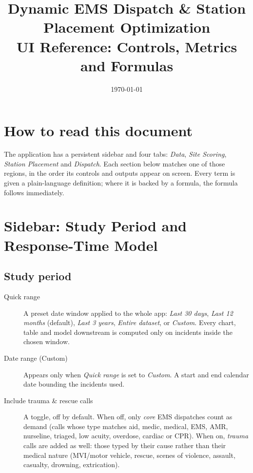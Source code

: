 \documentclass[11pt]{article}
\title{Dynamic EMS Dispatch \& Station Placement Optimization\\[4pt]
\large UI Reference: Controls, Metrics and Formulas}
\author{}
\date{\today}
\begin{document}
\maketitle
\tableofcontents

\section*{How to read this document}
The application has a persistent sidebar and four tabs: \emph{Data}, \emph{Site
Scoring}, \emph{Station Placement} and \emph{Dispatch}. Each section below
matches one of those regions, in the order its controls and outputs appear on
screen. Every term is given a plain-language definition; where it is backed by
a formula, the formula follows immediately.

\section{Sidebar: Study Period and Response-Time Model}

\subsection{Study period}
\begin{description}
  \item[Quick range] A preset date window applied to the whole app: \emph{Last
    30 days}, \emph{Last 12 months} (default), \emph{Last 3 years},
    \emph{Entire dataset}, or \emph{Custom}. Every chart, table and model
    downstream is computed only on incidents inside the chosen window.
  \item[Date range (Custom)] Appears only when \emph{Quick range} is set to
    \emph{Custom}. A start and end calendar date bounding the incidents used.
  \item[Include trauma \& rescue calls] A toggle, off by default. When off,
    only \emph{core} EMS dispatches count as demand (calls whose type matches
    aid, medic, medical, EMS, AMR, nurseline, triaged, low acuity, overdose,
    cardiac or CPR). When on, \emph{trauma} calls are added as well: those
    typed by their cause rather than their medical nature (MVI/motor vehicle,
    rescue, scenes of violence, assault, casualty, drowning, extrication).
\end{description}
\end{document}
